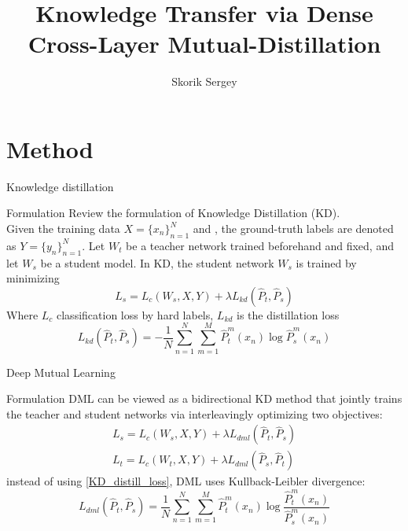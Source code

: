 \documentclass{beamer}
\title{Knowledge Transfer via Dense Cross-Layer
Mutual-Distillation}
\author{Skorik Sergey}
\institute{MIPT, 2023}
\begin{document}
\begin{frame}
    \titlepage
\end{frame}


\begin{frame}
    \tableofcontents
\end{frame}

\section{Method}

\begin{frame}{Knowledge distillation}
    \begin{block}{Formulation}
        Review the formulation of Knowledge Distillation (KD). \\
        Given the training data $X=\{x_n\}_{n=1}^N$ and , the ground-truth labels are denoted as $Y = \{y_n\}_{n=1}^N$. Let $W_t$ be a teacher network trained beforehand and fixed, and let $W_s$ be a student model. In KD, the student network $W_s$ is trained by minimizing
        \begin{equation}\label{KD_objective}
            L_s = L_c(W_s, X, Y) + \lambda L_{kd}(\hat{P}_t, \hat{P}_s)
        \end{equation}
        Where $L_c$ classification loss by hard labels, $L_{kd}$ is the distillation loss
        \begin{equation}\label{KD_distill_loss}
            L_{kd}(\hat{P}_t, \hat{P}_s) = -\dfrac{1}{N}\sum_{n=1}^N\sum_{m=1}^M\hat{P}_t^m(x_n) \log \hat{P}_s^m(x_n)
        \end{equation}
    \end{block}
\end{frame}

\begin{frame}{Deep Mutual Learning}
    \begin{block}{Formulation}
        DML can be viewed as a bidirectional KD method that jointly trains the teacher and student networks via interleavingly optimizing two objectives:
        \begin{equation}\label{DML_onjective}
        \begin{split}
            L_s = L_c(W_s, X, Y) + \lambda L_{dml}(\hat{P}_t, \hat{P}_s) \\
            L_t = L_c(W_t, X, Y) + \lambda L_{dml}(\hat{P}_s, \hat{P}_t)
        \end{split}
        \end{equation}
         instead of using \eqref{KD_distill_loss}, DML uses Kullback-Leibler divergence:
         \begin{equation}\label{DML_distill_loss}
             L_{dml}(\hat{P}_t, \hat{P}_s) = \dfrac{1}{N}\sum_{n=1}^N\sum_{m=1}^M\hat{P}_t^m(x_n) \log \dfrac{\hat{P}_t^m(x_n)}{\hat{P}_s^m(x_n)}
         \end{equation}
    \end{block}
\end{frame}
\end{document}
